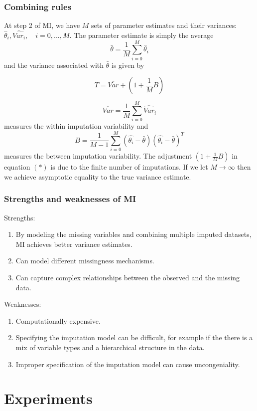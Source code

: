 \documentclass{beamer}
\begin{document}
\begin{frame}
\frametitle{Combining rules}
At step 2 of MI, we have $M$ sets of parameter estimates and their variances: $\hat{\theta}_{i},\hat{Var_{i}}, \quad i=0,...,M$. The parameter estimate is simply the average $$\bar{\theta} = \frac{1}{M}\sum_{i=0}^{M}\hat{\theta}_{i}$$ and the variance associated with $\bar{\theta}$ is given by 

\begin{equation}
T = \overline{Var}+(1+\frac{1}{M}B)\tag{*}
\end{equation}

\end{frame}

\begin{frame}
$$\overline{Var} = \frac{1}{M}\sum_{i=0}^{M}\hat{Var}_{i}$$ measures the within imputation variability and $$B = \frac{1}{M-1}\sum_{i=0}^{M}(\hat{\theta_{i}}-\bar{\theta})(\hat{\theta_{i}}-\bar{\theta})^{T}$$ measures the between imputation variability. The adjustment $(1+\frac{1}{M}B)$ in equation $(*)$ is due to the finite number of imputations. If we let $M\rightarrow\infty$ then we achieve asymptotic equality to the true variance estimate.
\end{frame}

\begin{frame}
\frametitle{Strengths and weaknesses of MI}
Strengths:
\begin{enumerate}
	\item<1-> By modeling the missing variables and combining multiple imputed datasets, MI achieves better variance estimates.
	\item<2-> Can model different missingness mechanisms.
	\item<3-> Can capture complex relationships between the observed and the missing data.
\end{enumerate}

Weaknesses:
\begin{enumerate}
	\item<1-> Computationally expensive.
	\item<2-> Specifying the imputation model can be difficult, for example if the there is a mix of variable types and a hierarchical structure in the data.
	\item<3-> Improper specification of the imputation model can cause uncongeniality. 
\end{enumerate}
\end{frame}

\section{Experiments}
\end{document}
